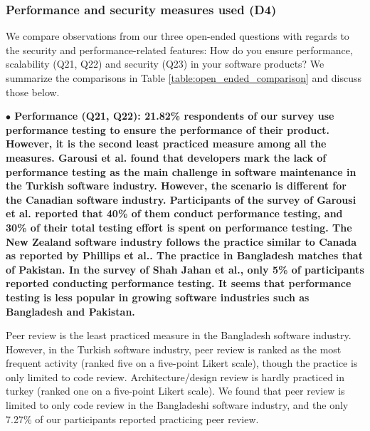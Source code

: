 \subsubsection{Performance and security measures used (D4)}\label{sec:rq2-d4}
We compare observations from our three open-ended questions with regards to the security and performance-related features:
How do you ensure performance, scalability (Q21, Q22) and security (Q23) in your software products? We summarize the 
comparisons in Table \ref{table:open_ended_comparison} and discuss those below.





\nd\bf{$\bullet$ Performance (Q21, Q22):} 21.82\% respondents of
our survey use performance testing to ensure the performance of their product.
However, it is
the second least practiced measure among all the measures. Garousi et
al.\citep{Garousi2015} found that developers mark the lack of performance
testing as the main challenge in software maintenance in the Turkish software
industry. However, the scenario is different for the Canadian software industry.
Participants of the survey of Garousi et al.\citep{Garousi2013} reported that
40\% of them conduct performance testing, and 30\% of their total testing effort
is spent on performance testing. The New Zealand software industry follows the
practice similar to Canada as reported by Phillips et al.\citep{Phillips2003}.
The practice in Bangladesh matches that of Pakistan.
In the survey of Shah Jahan et al.\citep{Jahan2019}, only 5\% of participants
reported conducting performance testing. It seems that performance testing is
less popular in growing software industries such as Bangladesh and Pakistan.

Peer review is the least practiced measure in the Bangladesh software industry.
However, in the Turkish software industry, peer review is ranked as the most
frequent activity\citep{Garousi2015} (ranked five on a five-point Likert scale),
though the practice is only limited to code review. Architecture/design review
is hardly practiced in turkey (ranked one on a five-point Likert scale). We
found that peer review is limited to only code review in the Bangladeshi
software industry, and the only 7.27\% of our participants reported practicing
peer review.

